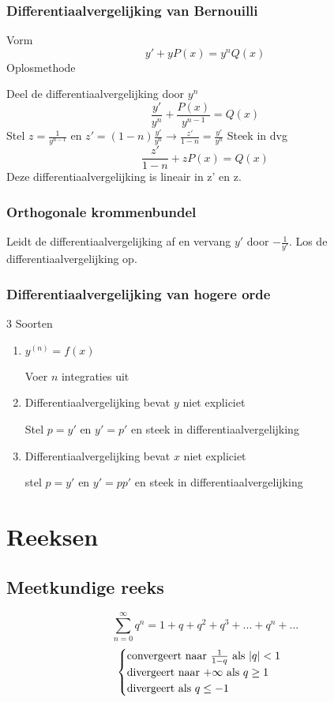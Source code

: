 \documentclass{report}
\begin{document}
\subsection*{Differentiaalvergelijking van Bernouilli}
Vorm
$$y' + yP(x) = y^nQ(x)$$
Oplosmethode

Deel de differentiaalvergelijking door $y^n$
$$\frac{y'}{y^n} + \frac{P(x)}{y^{n - 1}} = Q(x)$$
Stel $z = \frac{1}{y^{n - 1}}$ en $z' = (1 - n)\frac{y'}{y^n} \rightarrow \frac{z'}{1 - n} = \frac{y'}{y^n}$
Steek in dvg
$$\frac{z'}{1 - n} + zP(x) = Q(x)$$
Deze differentiaalvergelijking is lineair in z' en z.

\subsection*{Orthogonale krommenbundel}
Leidt de differentiaalvergelijking af en vervang $y'$ door $-\frac{1}{y'}$. Los de differentiaalvergelijking op.

\subsection*{Differentiaalvergelijking van hogere orde}
3 Soorten
\begin{enumerate}

 \item $y^{(n)} = f(x)$
 
        Voer $n$ integraties uit
 \item Differentiaalvergelijking bevat $y$ niet expliciet
 
        Stel $p = y'$ en $y' = p'$ en steek in differentiaalvergelijking
        
 \item Differentiaalvergelijking bevat $x$ niet expliciet
        
        stel $p = y'$ en $y' = pp'$ en steek in differentiaalvergelijking
\end{enumerate}


\chapter*{Reeksen}
\section*{Meetkundige reeks}
$$\sum_{n = 0}^{\infty} q^n = 1 + q + q^2 + q^3 + ... + q^n + ...$$
$$\begin{cases}
   \hbox{convergeert naar } \frac{1}{1 - q} \hbox{ als } |q| < 1 \\
   \hbox{divergeert naar +}\infty \hbox{ als } q \geq 1 \\
   \hbox{divergeert als } q \leq -1
  \end{cases}
$$
\end{document}
